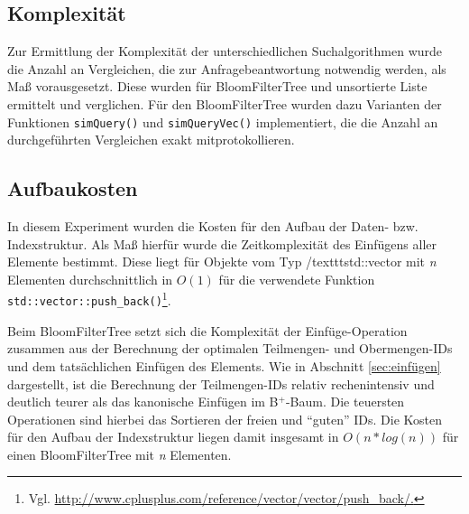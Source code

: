 \subsection{Komplexität}\label{sec:komplexität}
Zur Ermittlung der Komplexität der unterschiedlichen Suchalgorithmen wurde die Anzahl an Vergleichen, die zur Anfragebeantwortung notwendig werden, als Maß vorausgesetzt. Diese wurden für BloomFilterTree und unsortierte Liste ermittelt und verglichen. Für den BloomFilterTree wurden dazu Varianten der Funktionen \texttt{simQuery()} und \texttt{simQueryVec()} implementiert, die die Anzahl an durchgeführten Vergleichen exakt mitprotokollieren.   
\subsection{Aufbaukosten}\label{sec:aufbaukosten}
In diesem Experiment wurden die Kosten für den Aufbau der Daten- bzw. Indexstruktur. Als Maß hierfür wurde die Zeitkomplexität des Einfügens aller Elemente bestimmt. Diese liegt für Objekte vom Typ /texttt{std::vector} mit \textit{n} Elementen durchschnittlich in $O(1)$ für die verwendete Funktion \texttt{std::vector::push\_back()}\footnote{Vgl. \url{http://www.cplusplus.com/reference/vector/vector/push_back/.}}. 

Beim BloomFilterTree setzt sich die Komplexität der Einfüge-Operation zusammen aus der Berechnung der optimalen Teilmengen- und Obermengen-IDs und dem tatsächlichen Einfügen des Elements. Wie in Abschnitt \ref{sec:einfügen} dargestellt, ist die Berechnung der Teilmengen-IDs relativ rechenintensiv und deutlich teurer als das kanonische Einfügen im B$^+$-Baum. Die teuersten Operationen sind hierbei das Sortieren der freien und "`guten"' IDs. Die Kosten für den Aufbau der Indexstruktur liegen damit insgesamt in $O(n\ast log(n))$ für einen BloomFilterTree mit \textit{n} Elementen. 
